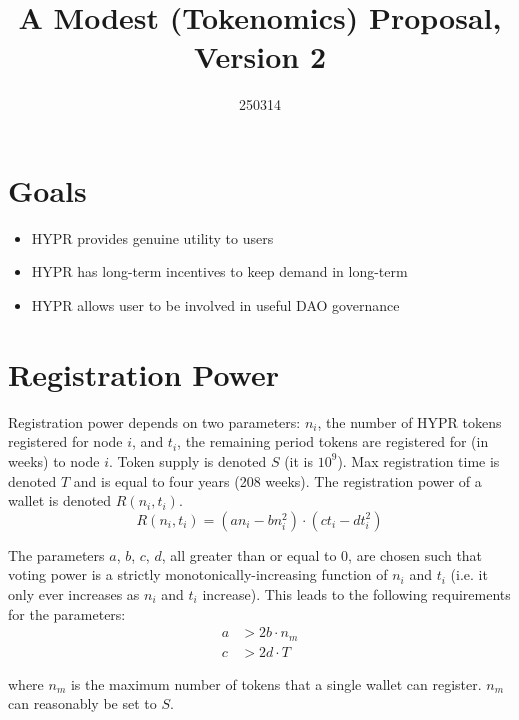 \documentclass{article}
\title{A Modest (Tokenomics) Proposal, Version 2}
\date{250314}
\author{}
\begin{document}
\maketitle

\section{Goals}\label{sec:goals}
\begin{itemize}
    \item HYPR provides genuine utility to users
    \item HYPR has long-term incentives to keep demand in long-term
    \item HYPR allows user to be involved in useful DAO governance
\end{itemize}

\section{Registration Power}\label{sec:registration}

Registration power depends on two parameters: $n_i$, the number of HYPR tokens registered for node $i$, and $t_i$, the remaining period tokens are registered for (in weeks) to node $i$.
Token supply is denoted $S$ (it is $10^9$).
Max registration time is denoted $T$ and is equal to four years (208 weeks).
The registration power of a wallet is denoted $R(n_i, t_i)$.
\begin{equation}
R(n_i, t_i) = (an_i - bn_i^2) \cdot (ct_i - dt_i^2)
\end{equation}

The parameters $a$, $b$, $c$, $d$, all greater than or equal to $0$, are chosen such that voting power is a strictly monotonically-increasing function of $n_i$ and $t_i$ (i.e. it only ever increases as $n_i$ and $t_i$ increase).
This leads to the following requirements for the parameters:
\begin{align}
a &> 2b \cdot n_m\\
c &> 2d \cdot T
\end{align}

where $n_m$ is the maximum number of tokens that a single wallet can register.
$n_m$ can reasonably be set to $S$.
\end{document}
